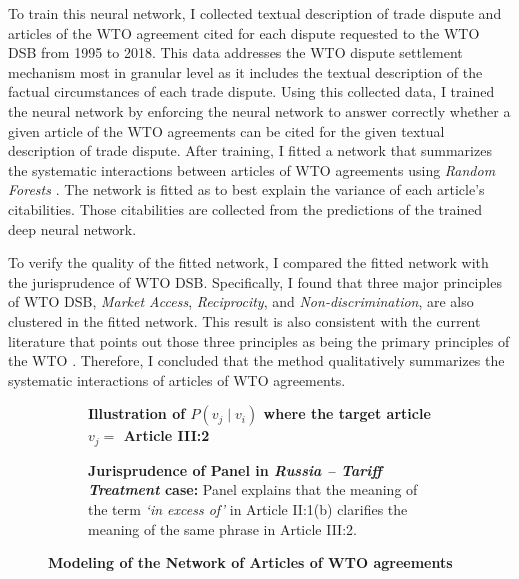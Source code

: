 To train this neural network, I collected textual description of trade dispute and articles of the WTO agreement cited for each dispute requested to the WTO DSB
from 1995 to 2018. This data addresses the WTO dispute settlement mechanism most in granular level as it includes the textual description of the factual circumstances of each trade dispute.
Using this collected data, I trained the neural network by enforcing the neural network to answer correctly
whether a given article of the WTO agreements
can be cited for the given textual description of
trade dispute. After training, I fitted a network that summarizes the systematic interactions between articles of WTO agreements using \textit{Random Forests} \citep{rf, genie3}.
The network is fitted as to best explain the variance of each article's citabilities. Those citabilities are collected from the predictions of the trained deep neural network.

To verify the quality of the fitted network, I compared the fitted network with the jurisprudence of WTO DSB.
Specifically, I found that three major principles of WTO DSB, \textit{Market Access}, \textit{Reciprocity}, and \textit{Non-discrimination}, are also clustered in the fitted network.
This result is also consistent with the current literature that points out those three principles as being the primary principles of the WTO \citep{bagwell}.
Therefore, I concluded that the method qualitatively summarizes the systematic interactions of articles of WTO agreements.


\begin{figure}[t!]
 \captionsetup[subfigure]{justification=centering}
 \begin{subfigure}[b]{1\textwidth}
     \centering{
         
     }
     \caption{\textbf{Illustration of $P(v_j \mid v_i)$ where the target article $v_j=$ Article III:2}}
     \label{subfig:a:art2b}
 \end{subfigure}
 \vfill
 \begin{subfigure}[b]{1\textwidth}
     \centering{
         
     }
     \centering
     \caption{\textbf{Jurisprudence of Panel in \textit{Russia – Tariff Treatment} case:} Panel explains that the meaning of the term \textit{`in excess of'} in Article II:1(b) clarifies the meaning of the same phrase in Article III:2.}
     \label{subfig:a:condprob}
 \end{subfigure}
 \caption{\textbf{Modeling of the Network of Articles of WTO agreements}}
 \label{fig:def-example}
\end{figure}
 
